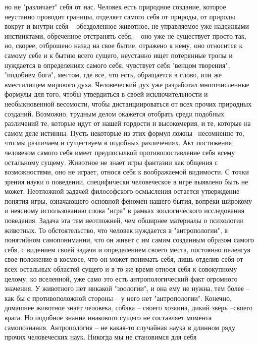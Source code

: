 \documentclass[12pt]{article}
\begin{document}
но не "различает" себя от нас. Человек есть природное создание, которое неустанно проводит границы, отделяет
самого себя от природы, от природы вокруг и внутри себя -- обездоленное животное, не управляемое уже
надежными  инстинктами,  обреченное  отстранять  себя,  --  оно  уже  не  существует  просто  так,  но,  скорее,
отброшено назад на свое бытие, отражено к нему, оно относится к самому себе и к бытию всего сущего,
неустанно ищет потерянные тропы и нуждается в определениях самого себя, чувствует себя "венцом творения",
"подобием  бога",  местом,  где  все,  что  есть,  обращается  в  слово,  или  же  вместилищем  мирового  духа.
Человеческий  дух  уже  разработал  многочисленные  формулы  для  того,  чтобы  утвердиться  в  своей
исключительности  и  необыкновенной  весомости,  чтобы  дистанциироваться  от  всех  прочих  природных
созданий. Возможно, трудным делом окажется отобрать среди подобных различений те, которые идут от нашей
гордости и высокомерия, и те, которые на самом деле истинны. Пусть некоторые из этих формул ложны --несомненно то, что мы различаем и существуем в подобных различениях. Акт постижения человеком самого
себя  имеет  предпосылкой  противопоставление  себя  всему  остальному  сущему.  Животное  не  знает  игры
фантазии как общения с возможностями, оно не играет, относя себя к воображаемой видимости. С точки зрения
науки  о  поведении,  специфически  человеческое  в  игре  выявлено  быть  не  может.  Неотложной  задачей
философского осмысления остается утверждение понятия игры, означающего основной феномен нашего бытия,
вопреки широкому и неясному использованию слова "игра" в рамках зоологического исследования поведения.
Задача эта тем неотложней, чем обширнее материалы о психологии животных. То обстоятельство, что человек
нуждается в "антропологии", в понятийном самопонимании, что он живет с им самим созданным образом
самого себя, с видением своей задачи и определением своего места, постоянно пеленгуя свое положение в
космосе, что он может понимать себя, лишь отделив себя от всех остальных областей сущего и в то же время
относя  себя  к  совокупному  целому,  ко  вселенной,  уже  само  это  есть  антропологический  факт  огромного
значения.
У животного нет никакой "зоологии", и она ему не нужна, тем более -- как бы с противоположной стороны -- у
него нет "антропологии". Конечно, домашнее животное знает человека, собака -- своего хозяина, дикий зверь --своего врага. Но подобное знание инакового сущего не составляет момента самопознания. Антропология -- не
какая-то случайная наука в длинном ряду прочих человеческих наук. Никогда мы не становимся для себя
\end{document}
